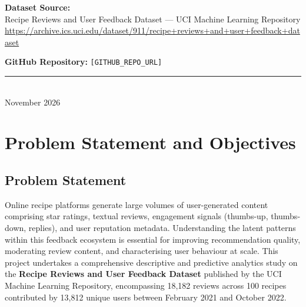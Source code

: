 \documentclass[12pt,a4paper]{article}
\begin{document}
\begin{titlepage}
\begin{center}
\vspace{1.5cm}

\textbf{Dataset Source:}\\
Recipe Reviews and User Feedback Dataset --- UCI Machine Learning Repository\\
\url{https://archive.ics.uci.edu/dataset/911/recipe+reviews+and+user+feedback+dataset}

\vspace{0.6cm}
\textbf{GitHub Repository:} \texttt{[GITHUB\_REPO\_URL]}

\vspace{1cm}
\textcolor{accentgold}{\rule{0.4\textwidth}{1pt}}\\[6pt]
{\small November 2026}

\end{center}
\end{titlepage}

\newpage
\tableofcontents
\newpage

\section{Problem Statement and Objectives}

\subsection{Problem Statement}

Online recipe platforms generate large volumes of user-generated content comprising star ratings, textual reviews, engagement signals (thumbs-up, thumbs-down, replies), and user reputation metadata. Understanding the latent patterns within this feedback ecosystem is essential for improving recommendation quality, moderating review content, and characterising user behaviour at scale. This project undertakes a comprehensive descriptive and predictive analytics study on the \textbf{Recipe Reviews and User Feedback Dataset} published by the UCI Machine Learning Repository, encompassing 18{,}182 reviews across 100 recipes contributed by 13{,}812 unique users between February 2021 and October 2022.
\end{document}
